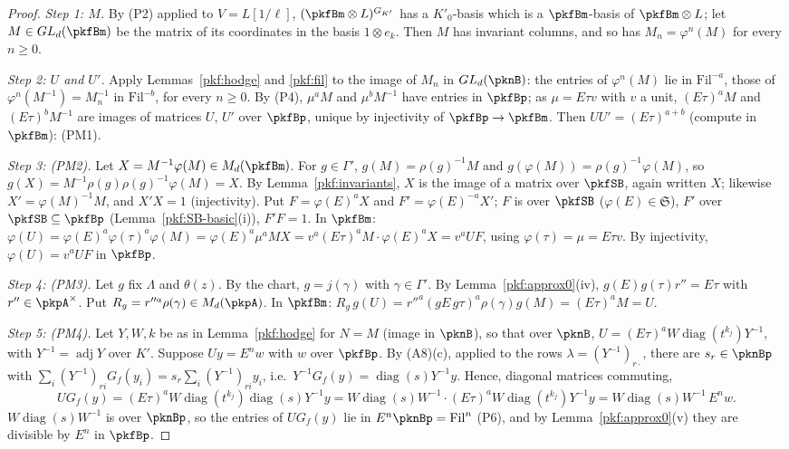 \documentclass[10pt]{amsart}
\theoremstyle{definition}
\theoremstyle{remark}
\begin{document}
\begin{proof}
\emph{Step 1: $M$.} By (P2) applied to $V=L[1/\ell]$, $(\pkfBm\otimes L)^{G_{K'}}$ has a $K'_0$-basis
which is a $\pkfBm$-basis of $\pkfBm\otimes L$; let $M\in GL_d(\pkfBm)$ be the matrix of its coordinates
in the basis $1\otimes e_k$. Then $M$ has invariant columns, and so has $M_n=\varphi^n(M)$ for every
$n\ge0$.

\emph{Step 2: $U$ and $U'$.} Apply Lemmas~\ref{pkf:hodge} and \ref{pkf:fil} to the image of $M_n$ in
$GL_d(\pknB)$: the entries of $\varphi^n(M)$ lie in $\mathrm{Fil}^{-a}$, those of $\varphi^n(M^{-1})=
M_n^{-1}$ in $\mathrm{Fil}^{-b}$, for every $n\ge0$. By (P4), $\mu^aM$ and $\mu^bM^{-1}$ have entries in
$\pkfBp$; as $\mu=E\tau v$ with $v$ a unit, $(E\tau)^aM$ and $(E\tau)^bM^{-1}$ are images of matrices $U$,
$U'$ over $\pkfBp$, unique by injectivity of $\pkfBp\to\pkfBm$. Then $UU'=(E\tau)^{a+b}$ (compute in
$\pkfBm$): (PM1).

\emph{Step 3: (PM2).} Let $X=M^{-1}\varphi(M)\in M_d(\pkfBm)$. For $g\in\Gamma'$, $g(M)=\rho(g)^{-1}M$
and $g(\varphi(M))=\rho(g)^{-1}\varphi(M)$, so $g(X)=M^{-1}\rho(g)\rho(g)^{-1}\varphi(M)=X$. By
Lemma~\ref{pkf:invariants}, $X$ is the image of a matrix over $\pkfSB$, again written $X$; likewise
$X'=\varphi(M)^{-1}M$, and $X'X=1$ (injectivity). Put $F=\varphi(E)^aX$ and $F'=\varphi(E)^{-a}X'$; $F$
is over $\pkfSB$ ($\varphi(E)\in\mathfrak S$), $F'$ over $\pkfSB\subseteq\pkfBp$
(Lemma~\ref{pkf:SB-basic}(i)), $F'F=1$. In $\pkfBm$: $\varphi(U)=\varphi(E)^a\varphi(\tau)^a\varphi(M)=
\varphi(E)^a\mu^aMX=v^a(E\tau)^aM\cdot\varphi(E)^aX=v^aUF$, using $\varphi(\tau)=\mu=E\tau v$. By
injectivity, $\varphi(U)=v^aUF$ in $\pkfBp$.

\emph{Step 4: (PM3).} Let $g$ fix $\Lambda$ and $\theta(z)$. By the chart, $g=j(\gamma)$ with
$\gamma\in\Gamma'$. By Lemma~\ref{pkf:approx0}(iv), $g(E)g(\tau)r''=E\tau$ with $r''\in\pkpA^\times$. Put
$R_g=r''^a\rho(\gamma)\in M_d(\pkpA)$. In $\pkfBm$: $R_g\,g(U)=r''^a(gE\,g\tau)^a\rho(\gamma)g(M)=
(E\tau)^aM=U$.

\emph{Step 5: (PM4).} Let $Y,W,k$ be as in Lemma~\ref{pkf:hodge} for $N=M$ (image in $\pknB$), so that
over $\pknB$, $U=(E\tau)^aW\operatorname{diag}(t^{k_j})Y^{-1}$, with $Y^{-1}=\operatorname{adj}Y$ over $K'$.
Suppose $Uy=E^nw$ with $w$ over $\pkfBp$. By (A8)(c), applied to the rows $\lambda=(Y^{-1})_{r\cdot}$,
there are $s_r\in\pknBp$ with $\sum_i(Y^{-1})_{ri}G_f(y_i)=s_r\sum_i(Y^{-1})_{ri}y_i$, i.e.\
$Y^{-1}G_f(y)=\operatorname{diag}(s)Y^{-1}y$. Hence, diagonal matrices commuting,
\[UG_f(y)=(E\tau)^aW\operatorname{diag}(t^{k_j})\operatorname{diag}(s)Y^{-1}y
=W\operatorname{diag}(s)W^{-1}\cdot(E\tau)^aW\operatorname{diag}(t^{k_j})Y^{-1}y
=W\operatorname{diag}(s)W^{-1}\,E^nw .\]
$W\operatorname{diag}(s)W^{-1}$ is over $\pknBp$, so the entries of $UG_f(y)$ lie in $E^n\pknBp=
\mathrm{Fil}^n$ (P6), and by Lemma~\ref{pkf:approx0}(v) they are divisible by $E^n$ in $\pkfBp$.
\end{proof}
\end{document}

